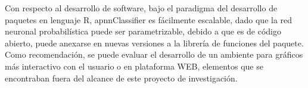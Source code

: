 Con respecto al desarrollo de software, bajo el paradigma del desarrollo de paquetes en lenguaje R, apnnClassifier es fácilmente escalable, dado que la red neuronal probabilística puede ser parametrizable, debido a que es de código abierto, puede anexarse en nuevas versiones a la
librería de funciones del paquete.\\

Como recomendación, se puede evaluar el desarrollo de un ambiente para gráficos más interactivo con el usuario o en plataforma WEB, elementos que se encontraban fuera del alcance de este proyecto de investigación.\\